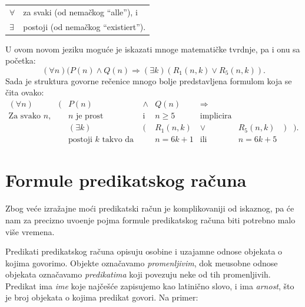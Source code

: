 \begin{tabular}{l@{\quad$\leadsto$\quad}l}
  $\forall$ & za svaki (od nema\v ckog \enquote{alle}), i\\
  $\exists$ & postoji (od nema\v ckog \enquote{existiert}).\\
\end{tabular}

\medskip

\noindent
U ovom novom jeziku mogu\'ce je iskazati mnoge matemati\v cke tvrdnje, pa i onu sa po\v cetka:
$$
  (\forall n) (P(n) \land Q(n) \Rightarrow (\exists k) (R_1(n, k) \lor R_5(n, k)).
$$
Sada je struktura govorne re\v cenice mnogo bolje predstavljena formulom koja se \v cita ovako:
$$
  \begin{array}{cccccccccccccccccccc}
    (\forall n)          & \Big( & P(n)               & \land    & Q(n)    & \Rightarrow \\
    \text{Za svako } n,  &   & n\text{ je prost}  & \text{i} & n \ge 5 & \text{implicira}\\[3mm]
    & & (\exists k)          & ( & R_1(n, k)            & \lor     & R_5(n, k) & ) & \Big). \\
    & & \text{postoji } k \text{ takvo da }  &   & n = 6k + 1  & \text{ili} & n = 6k + 5
  \end{array}
$$

\section{Formule predikatskog ra\v cuna}

Zbog ve\'ce izra\v zajne mo\'ci predikatski ra\v cun je komplikovaniji od iskaznog, pa \'ce nam
za precizno uvo\dj enje pojma formule predikatskog ra\v cuna biti potrebno malo vi\v se vremena.

Predikati predikatskog ra\v cuna opisuju osobine i uzajamne odnose objekata o kojima govorimo.
Objekte ozna\v cavamo \emph{promenljivim}, dok me\dj usobne odnose objekata ozna\v cavamo
\emph{predikatima} koji povezuju neke od tih promenljivih.
Predikat ima \emph{ime} koje naj\v ce\v s\'ce zapisujemo kao latini\v cno slovo,
i ima \emph{arnost}, \v sto je broj objekata o kojima predikat govori. Na primer:

